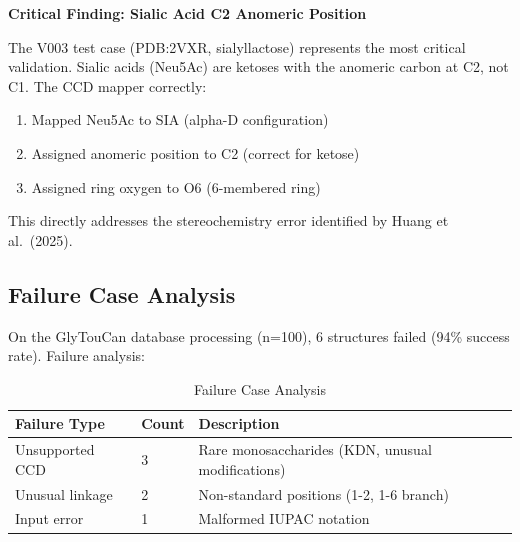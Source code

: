 \textbf{Critical Finding: Sialic Acid C2 Anomeric Position}

The V003 test case (PDB:2VXR, sialyllactose) represents the most critical validation. Sialic acids (Neu5Ac) are ketoses with the anomeric carbon at C2, not C1. The CCD mapper correctly:
\begin{enumerate}
\item Mapped Neu5Ac to SIA (alpha-D configuration)
\item Assigned anomeric position to C2 (correct for ketose)
\item Assigned ring oxygen to O6 (6-membered ring)
\end{enumerate}

This directly addresses the stereochemistry error identified by Huang et al.\ (2025).

\subsection{Failure Case Analysis}

On the GlyTouCan database processing (n=100), 6 structures failed (94\% success rate). Failure analysis:

\begin{table}[h]
\centering
\caption{Failure Case Analysis}
\begin{tabular}{lll}
\toprule
Failure Type & Count & Description \\
\midrule
Unsupported CCD & 3 & Rare monosaccharides (KDN, unusual modifications) \\
Unusual linkage & 2 & Non-standard positions (1-2, 1-6 branch) \\
Input error & 1 & Malformed IUPAC notation \\
\bottomrule
\end{tabular}
\label{tab:failures}
\end{table}